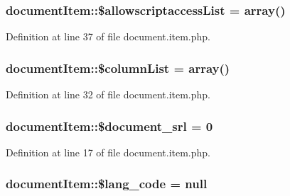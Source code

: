 \hypertarget{classdocumentItem_a3b10cc840f3a20580d3ab2269ef24df3}{}
\subsubsection[{\$allowscriptaccess\+List}]{\setlength{\rightskip}{0pt plus 5cm}document\+Item\+::\$allowscriptaccess\+List = array()}\label{classdocumentItem_a3b10cc840f3a20580d3ab2269ef24df3}


Definition at line 37 of file document.\+item.\+php.

\hypertarget{classdocumentItem_a244e1382304e15c5ae29e3311ef8e865}{}
\subsubsection[{\$column\+List}]{\setlength{\rightskip}{0pt plus 5cm}document\+Item\+::\$column\+List = array()}\label{classdocumentItem_a244e1382304e15c5ae29e3311ef8e865}


Definition at line 32 of file document.\+item.\+php.

\hypertarget{classdocumentItem_a87159d1cf24944d081646e6fe4f7e0f6}{}
\subsubsection[{\$document\+\_\+srl}]{\setlength{\rightskip}{0pt plus 5cm}document\+Item\+::\$document\+\_\+srl = 0}\label{classdocumentItem_a87159d1cf24944d081646e6fe4f7e0f6}


Definition at line 17 of file document.\+item.\+php.

\hypertarget{classdocumentItem_a5fa7aa5d52f248116250e95126e8ab87}{}
\subsubsection[{\$lang\+\_\+code}]{\setlength{\rightskip}{0pt plus 5cm}document\+Item\+::\$lang\+\_\+code = null}\label{classdocumentItem_a5fa7aa5d52f248116250e95126e8ab87}


